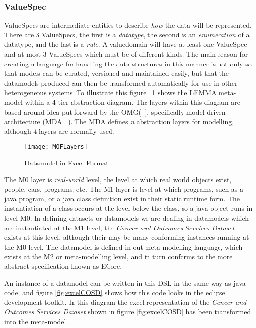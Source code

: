 \subsubsection{ValueSpec}
ValueSpecs are intermediate entities to describe \emph{how} the data will be represented. There are 3 ValueSpecs, the first is a \emph{datatype}, the second is an \emph{enumeration} of a datatype, and the last is a \emph{rule}. A valuedomain will have at least one ValueSpec and at most 3 ValueSpecs which must be of different kinds.
The main reason for creating a language for handling the data structures in this manner is not only so that models can be curated, versioned and maintained easily, but that the datamodels produced can then be transformed automatically for use in other heterogeneous systems. To illustrate this figure ~\ref{fig:mofLayers} shows the LEMMA meta-model within a 4 tier abstraction diagram. The layers within this diagram are based around idea put forward by the  OMG(~\cite{OMG}), specifically model driven architecture (MDA ~\cite{MDA}). The MDA defines \emph{n} abstraction layers for modelling, although 4-layers are normally used.
\begin{figure}[here] 
	\texttt{[image: MOFLayers]}
	\caption{ Datamodel in Excel Format} 
	\label{fig:mofLayers}
\end{figure}
The M0 layer is \emph{real-world} level, the level at which real world objects exist, people, cars, programs, etc. The M1 layer is level at which programs, such as a java program, or a java class definition exist in their static runtime form. The instantiation of a class occurs at the level below the class, so a java object runs in level M0. In defining datasets or datamodels we are dealing in datamodels which are instantiated at the M1 level, the \emph{Cancer and Outcomes Services Dataset} exists at this level, although their may be many conforming instances running at the M0 level. The datamodel is defined in out meta-modelling language, which exists at the M2 or meta-modelling level, and in turn conforms to the more abstract specification known as ECore.

An instance of a datamodel can be written in this DSL in the same way as java code, and figure \ref{fig:excelCOSD} shows how this code looks in the eclipse development toolkit. In this diagram the excel representation of the \emph{Cancer and Outcomes Services Dataset} shown in figure \ref{fig:excelCOSD} has been transformed into the meta-model.

